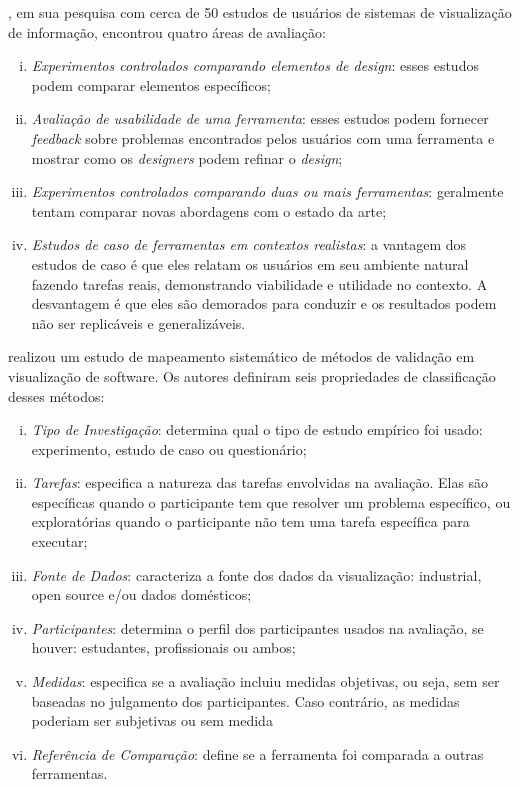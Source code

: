 \citeauthor{komlodi2004information}, em sua pesquisa com cerca de 50 estudos de usuários de sistemas de visualização de informação, encontrou quatro áreas de avaliação:
\begin{enumerate}[(i)]
	\item \textit{Experimentos controlados comparando elementos de design}: esses estudos podem comparar elementos específicos;
	\item \textit{Avaliação de usabilidade de uma ferramenta}: esses estudos podem fornecer \textit{feedback} sobre problemas encontrados pelos usuários com uma ferramenta e mostrar como os \textit{designers} podem refinar o \textit{design};
	\item \textit{Experimentos controlados comparando duas ou mais ferramentas}: geralmente tentam comparar novas abordagens com o estado da arte;
	\item \textit{Estudos de caso de ferramentas em contextos realistas}: a vantagem dos estudos de caso é que eles relatam os usuários em seu ambiente natural fazendo tarefas reais, demonstrando viabilidade e utilidade no contexto. A desvantagem é que eles são demorados para conduzir e os resultados podem não ser replicáveis e generalizáveis.
\end{enumerate}

\citeauthor{Seriai2014} realizou um estudo de mapeamento sistemático de métodos de validação em visualização de software. Os autores definiram seis propriedades de classificação desses métodos:
\begin{enumerate}[(i)]
	\item \textit{Tipo de Investigação}: determina qual o tipo de estudo empírico foi usado: experimento, estudo de caso ou questionário;
	\item \textit{Tarefas}: especifica a natureza das tarefas envolvidas na avaliação. Elas são específicas quando o participante tem que resolver um problema específico, ou exploratórias quando o participante não tem uma tarefa específica para executar;
	\item \textit{Fonte de Dados}: caracteriza a fonte dos dados da visualização: industrial, open source e/ou dados domésticos;
	\item \textit{Participantes}: determina o perfil dos participantes usados na avaliação, se houver: estudantes, profissionais ou ambos;
	\item \textit{Medidas}: especifica se a avaliação incluiu medidas objetivas, ou seja, sem ser baseadas no julgamento dos participantes. Caso contrário, as medidas poderiam ser subjetivas ou sem medida
	\item \textit{Referência de Comparação}: define se a ferramenta foi comparada a outras ferramentas.
\end{enumerate}

